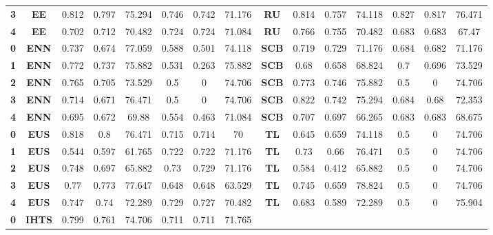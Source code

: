 {{\begin{tabular}{c|c|cccccc|ccccccc}
\textbf{3} & \textbf{EE} & 0.812 & 0.797 & 75.294 & 0.746 & 0.742 & 71.176 & \multicolumn{1}{c|}{\textbf{RU}} & 0.814 & 0.757 & 74.118 & 0.827 & 0.817 & 76.471 \\
\textbf{4} & \textbf{EE} & 0.702 & 0.712 & 70.482 & 0.724 & 0.724 & 71.084 & \multicolumn{1}{c|}{\textbf{RU}} & 0.766 & 0.755 & 70.482 & 0.683 & 0.683 & 67.47 \\
\textbf{0} & \textbf{ENN} & 0.737 & 0.674 & 77.059 & 0.588 & 0.501 & 74.118 & \multicolumn{1}{c|}{\textbf{SCB}} & 0.719 & 0.729 & 71.176 & 0.684 & 0.682 & 71.176 \\
\textbf{1} & \textbf{ENN} & 0.772 & 0.737 & 75.882 & 0.531 & 0.263 & 75.882 & \multicolumn{1}{c|}{\textbf{SCB}} & 0.68  & 0.658 & 68.824 & 0.7   & 0.696 & 73.529 \\
\textbf{2} & \textbf{ENN} & 0.765 & 0.705 & 73.529 & 0.5   & 0     & 74.706 & \multicolumn{1}{c|}{\textbf{SCB}} & 0.773 & 0.746 & 75.882 & 0.5   & 0     & 74.706 \\
\textbf{3} & \textbf{ENN} & 0.714 & 0.671 & 76.471 & 0.5   & 0     & 74.706 & \multicolumn{1}{c|}{\textbf{SCB}} & 0.822 & 0.742 & 75.294 & 0.684 & 0.68  & 72.353 \\
\textbf{4} & \textbf{ENN} & 0.695 & 0.672 & 69.88 & 0.554 & 0.463 & 71.084 & \multicolumn{1}{c|}{\textbf{SCB}} & 0.707 & 0.697 & 66.265 & 0.683 & 0.683 & 68.675 \\
\textbf{0} & \textbf{EUS} & 0.818 & 0.8   & 76.471 & 0.715 & 0.714 & 70    & \multicolumn{1}{c|}{\textbf{TL}} & 0.645 & 0.659 & 74.118 & 0.5   & 0     & 74.706 \\
\textbf{1} & \textbf{EUS} & 0.544 & 0.597 & 61.765 & 0.722 & 0.722 & 71.176 & \multicolumn{1}{c|}{\textbf{TL}} & 0.73  & 0.66  & 76.471 & 0.5   & 0     & 74.706 \\
\textbf{2} & \textbf{EUS} & 0.748 & 0.697 & 65.882 & 0.73  & 0.729 & 71.176 & \multicolumn{1}{c|}{\textbf{TL}} & 0.584 & 0.412 & 65.882 & 0.5   & 0     & 74.706 \\
\textbf{3} & \textbf{EUS} & 0.77  & 0.773 & 77.647 & 0.648 & 0.648 & 63.529 & \multicolumn{1}{c|}{\textbf{TL}} & 0.745 & 0.659 & 78.824 & 0.5   & 0     & 74.706 \\
\textbf{4} & \textbf{EUS} & 0.747 & 0.74  & 72.289 & 0.729 & 0.727 & 70.482 & \multicolumn{1}{c|}{\textbf{TL}} & 0.683 & 0.589 & 72.289 & 0.5   & 0     & 75.904 \\
\textbf{0} & \textbf{IHTS} & 0.799 & 0.761 & 74.706 & 0.711 & 0.711 & 71.765 &       &       &       &       &       &       &  \\

\end{tabular}}}

